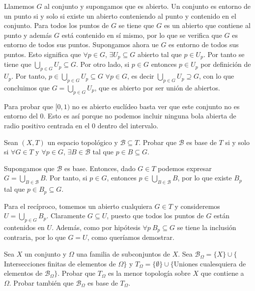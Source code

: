 \documentclass{article}
\begin{document}
\begin{sol}
Llamemos $G$ al conjunto y supongamos que es abierto. Un conjunto es entorno de un punto si y solo si existe un abierto conteniendo al punto y contenido en el conjunto. Para todos los puntos de $G$ se tiene que $G$ es un abierto que contiene al punto y además $G$ está contenido en sí mismo, por lo que se verifica que $G$ es entorno de todos sus puntos. Supongamos ahora ue $G$ es entorno de todos sus puntos. Esto significa que $\forall p\in G$, $\exists U_p\subseteq G$ abierto tal que $p\in U_p$. Por tanto se tiene que $\bigcup_{p\in G} U_p\subseteq G$. Por otro lado, si $p\in G$ entonces $p\in U_p$ por definición de $U_p$. Por tanto, $p\in \bigcup_{p\in G} U_p\subseteq G$ $\forall p\in G$, es decir $\bigcup_{p\in G} U_p\supseteq G$, con lo que concluimos que $G=\bigcup_{p\in G} U_p$, que es abierto por ser unión de abiertos.

Para probar que $[0,1)$ no es abierto euclídeo basta ver que este conjunto no es entorno del $0$. Esto es así porque no podemos incluir ninguna bola abierta de radio positivo centrada en el $0$ dentro del intervalo.
\end{sol}
\newpage

\begin{ejer}
Sean $(X,T)$ un espacio topológico y $\mathcal{B}\subseteq T$. Probar que $\mathcal{B}$ es base de $T$ si y solo si $\forall G\in T$ y $\forall p\in G$, $\exists B\in\mathcal{B}$ tal que $p\in B\subseteq G$. 
\end{ejer}

\begin{sol}
Supongamos que $\mathcal{B}$ es base. Entonces, dado $G\in T$ podemos expresar $G=\bigcup_{B\in\mathcal{B}} B$. Por tanto, si $p\in G$, entonces $p\in\bigcup_{B\in\mathcal{B}}B$, por lo que existe $B_p$ tal que $p\in B_p\subseteq G$. 

Para el recíproco, tomemos un abierto cualquiera $G\in T$ y consideremos $U=\bigcup_{p\in G} B_p$. Claramente $G\subseteq U$, puesto que todos los puntos de $G$ están contenidos en $U$. Además, como por hipótesis $\forall p\ B_p\subseteq G$ se tiene la inclusión contraria, por lo que $G=U$, como queríamos demostrar.
\end{sol}

\newpage
\begin{ejer}
Sea $X$ un conjunto y $\Omega$ una familia de subconjuntos de $X$. Sea $\mathcal{B}_\Omega=\{X\}\cup\{$ Intersecciones finitas de elementos de $\Omega\}$ y $T_\Omega=\{\emptyset\}\cup\{$Uniones cualesquiera de elementos de $\mathcal{B}_\Omega\}$. Probar que $T_\Omega$ es la menor topología sobre $X$ que contiene a $\Omega$. Probar también que $\mathcal{B}_\Omega$ es base de $T_\Omega$.
\end{ejer}
\end{document}
